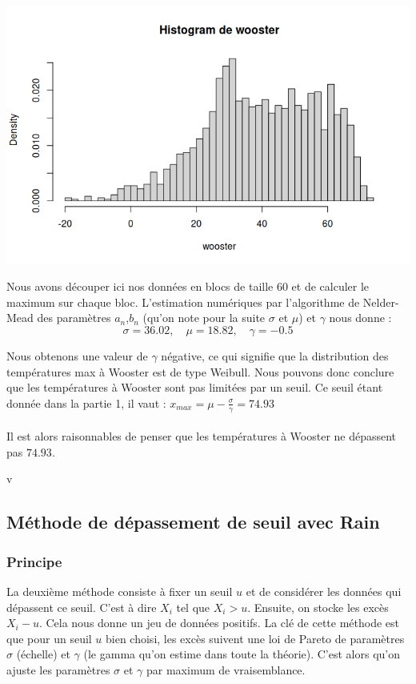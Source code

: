 \documentclass{article}
\begin{document}
\begin{center}
	\includegraphics[scale=0.8]{./images/woosterhisto.png} 
\end{center}

Nous avons découper ici nos données en blocs de taille $60$ et de calculer le maximum sur chaque bloc.
L'estimation numériques par l'algorithme de Nelder-Mead des paramètres $a_n$,$b_n$  (qu'on note pour la suite $\sigma$ et $\mu$) et $\gamma$ nous donne :
\[
\sigma = 36.02, \quad \mu= 18.82, \quad \gamma = -0.5
\]

Nous obtenons une valeur de $\gamma$ négative, ce qui signifie que la distribution des températures max à Wooster est de type Weibull.
Nous pouvons donc conclure que les températures à Wooster sont pas limitées par un seuil.
Ce seuil étant donnée dans la partie 1, il vaut : $x_{max} = \mu - \frac{\sigma}{\gamma} = 74.93 $
\\
\\
Il est alors raisonnables de penser que les températures à Wooster ne dépassent pas $74.93$.

v
\subsection{Méthode de dépassement de seuil avec \textbf{Rain}}

\subsubsection{Principe}

La deuxième méthode consiste à fixer un seuil $u$ et de considérer les données qui dépassent ce seuil. C'est à dire $X_i$ tel que $X_i > u$.
Ensuite, on stocke les excès $X_i - u$. Cela nous donne un jeu de données positifs.
La clé de cette méthode est que pour un seuil $u$ bien choisi, les excès suivent une loi de Pareto de paramètres $\sigma$ (échelle) et $\gamma$ (le gamma qu'on estime dans toute la théorie).
C'est alors qu'on ajuste les paramètres $\sigma$ et $\gamma$ par maximum de vraisemblance.
\end{document}
